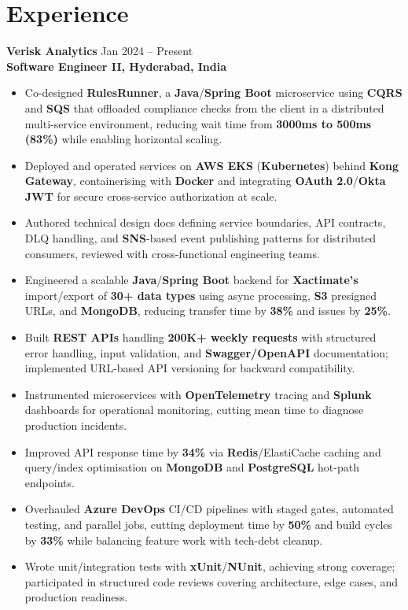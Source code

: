 \documentclass[a4paper,10pt]{article}
\begin{document}
\section*{Experience}

\textbf{Verisk Analytics} \hfill Jan 2024 -- Present \\
\textbf{Software Engineer II, Hyderabad, India}

\begin{itemize}[leftmargin=*]
    \item Co-designed \textbf{RulesRunner}, a \textbf{Java}/\textbf{Spring Boot} microservice using \textbf{CQRS} and \textbf{SQS} that offloaded compliance checks from the client in a distributed multi-service environment, reducing wait time from \textbf{3000ms to 500ms (83\%)} while enabling horizontal scaling.
    \item Deployed and operated services on \textbf{AWS EKS} (\textbf{Kubernetes}) behind \textbf{Kong Gateway}, containerising with \textbf{Docker} and integrating \textbf{OAuth 2.0}/\textbf{Okta JWT} for secure cross-service authorization at scale.
    \item Authored technical design docs defining service boundaries, API contracts, DLQ handling, and \textbf{SNS}-based event publishing patterns for distributed consumers, reviewed with cross-functional engineering teams.
    \item Engineered a scalable \textbf{Java}/\textbf{Spring Boot} backend for \textbf{Xactimate's} import/export of \textbf{30+ data types} using async processing, \textbf{S3} presigned URLs, and \textbf{MongoDB}, reducing transfer time by \textbf{38\%} and issues by \textbf{25\%}.
    \item Built \textbf{REST APIs} handling \textbf{200K+ weekly requests} with structured error handling, input validation, and \textbf{Swagger/OpenAPI} documentation; implemented URL-based API versioning for backward compatibility.
    \item Instrumented microservices with \textbf{OpenTelemetry} tracing and \textbf{Splunk} dashboards for operational monitoring, cutting mean time to diagnose production incidents.
    \item Improved API response time by \textbf{34\%} via \textbf{Redis}/ElastiCache caching and query/index optimisation on \textbf{MongoDB} and \textbf{PostgreSQL} hot-path endpoints.
    \item Overhauled \textbf{Azure DevOps} CI/CD pipelines with staged gates, automated testing, and parallel jobs, cutting deployment time by \textbf{50\%} and build cycles by \textbf{33\%} while balancing feature work with tech-debt cleanup.
    \item Wrote unit/integration tests with \textbf{xUnit}/\textbf{NUnit}, achieving strong coverage; participated in structured code reviews covering architecture, edge cases, and production readiness.
\end{itemize}
\end{document}
